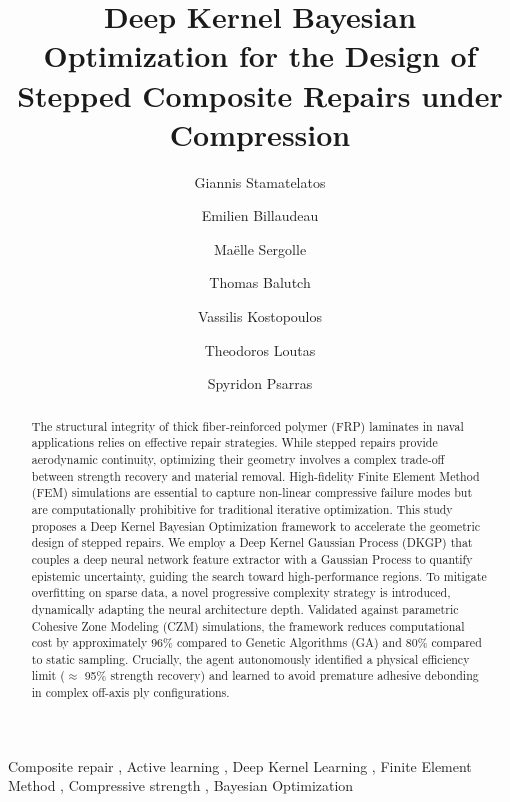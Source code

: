 \documentclass[
  preprint,
  12pt,
  a4paper
]{elsarticle}
\begin{document}
\begin{frontmatter}

\title{Deep Kernel Bayesian Optimization for the Design of Stepped Composite Repairs under Compression}


\author[1]{Giannis Stamatelatos}

\author[2]{Emilien Billaudeau}
\author[2]{Maëlle Sergolle}
\author[2]{Thomas Balutch}
\author[1]{Vassilis Kostopoulos}
\author[1]{Theodoros Loutas}
\author[1]{Spyridon Psarras}

\address[1]{Applied Mechanics Laboratory (AML), Department of Mechanical Engineering \& Aeronautics, University of Patras, Patras, Greece}
\address[2]{Naval Group, Centre d'Expertise des Structures et Matériaux Navals, Technocampus Océan, 5 rue de l'Halbran, 4434, France}


\begin{abstract}
The structural integrity of thick fiber-reinforced polymer (FRP) laminates in naval applications relies on effective repair strategies. While stepped repairs provide aerodynamic continuity, optimizing their geometry involves a complex trade-off between strength recovery and material removal. High-fidelity Finite Element Method (FEM) simulations are essential to capture non-linear compressive failure modes but are computationally prohibitive for traditional iterative optimization. This study proposes a Deep Kernel Bayesian Optimization framework to accelerate the geometric design of stepped repairs. We employ a Deep Kernel Gaussian Process (DKGP) that couples a deep neural network feature extractor with a Gaussian Process to quantify epistemic uncertainty, guiding the search toward high-performance regions. To mitigate overfitting on sparse data, a novel progressive complexity strategy is introduced, dynamically adapting the neural architecture depth. Validated against parametric Cohesive Zone Modeling (CZM) simulations, the framework reduces computational cost by approximately 96\% compared to Genetic Algorithms (GA) and 80\% compared to static sampling. Crucially, the agent autonomously identified a physical efficiency limit ($\approx$ 95\% strength recovery) and learned to avoid premature adhesive debonding in complex off-axis ply configurations.
\end{abstract}

\begin{keyword}
Composite repair \sep 
Active learning \sep 
Deep Kernel Learning \sep 
Finite Element Method \sep 
Compressive strength \sep 
Bayesian Optimization
\end{keyword}

\end{frontmatter}
\end{document}
